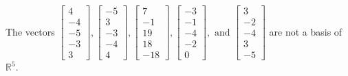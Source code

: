 \begin{exercise}
\begin{exerciseStatement}
  \end{exerciseStatement}
  \begin{exerciseAnswer}
   The vectors \(\left[\begin{array}{r}
4 \\
-4 \\
-5 \\
-3 \\
3
\end{array}\right] , \left[\begin{array}{r}
-5 \\
3 \\
-3 \\
-4 \\
4
\end{array}\right] , \left[\begin{array}{r}
7 \\
-1 \\
19 \\
18 \\
-18
\end{array}\right] , \left[\begin{array}{r}
-3 \\
-1 \\
-4 \\
-2 \\
0
\end{array}\right] , \text{ and } \left[\begin{array}{r}
3 \\
-2 \\
-4 \\
3 \\
-5
\end{array}\right]\) 
  	 are not  a basis of \(\mathbb{R}^5\).
  


  \end{exerciseAnswer}
\end{exercise}